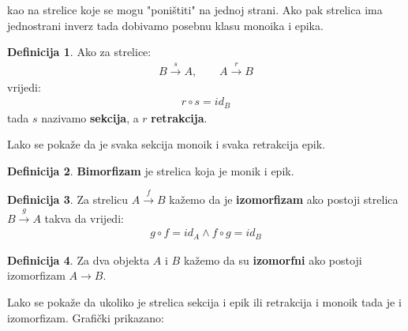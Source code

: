 \documentclass[11pt]{article}
\theoremstyle{definition}
\newtheorem{definition}{Definicija}
\begin{document}
    kao na strelice koje se mogu "poništiti" na jednoj strani. Ako pak strelica
    ima jednostrani inverz tada dobivamo posebnu klasu monoika i epika.
    \begin{definition}
      Ako za strelice:
      \begin{align*}
        B \xrightarrow{s} A, \qquad A \xrightarrow{r} B
      \end{align*}
      vrijedi:
      \begin{align*}
        r \circ s = id_B
      \end{align*}
      tada $s$ nazivamo \textbf{sekcija}, a $r$ \textbf{retrakcija}.
    \end{definition}
    Lako se pokaže da je svaka sekcija monoik i svaka retrakcija epik.
    \begin{definition}
      \textbf{Bimorfizam} je strelica koja je monik i epik.
    \end{definition}
    \begin{definition}
      Za strelicu $A \xrightarrow{f} B$ kažemo da je \textbf{izomorfizam} ako
      postoji strelica $B \xrightarrow{g} A$ takva da vrijedi:
      \begin{align}
        g \circ f = id_A \wedge f \circ g = id_B
      \end{align}
    \end{definition}
    \begin{definition}
      Za dva objekta $A$ i $B$ kažemo da su \textbf{izomorfni} ako postoji izomorfizam
      $A \xrightarrow{} B$.
    \end{definition}

    Lako se pokaže da ukoliko je strelica sekcija i epik ili retrakcija i
    monoik tada je i izomorfizam.
    Grafički prikazano:
    \begin{center}
    \end{center}
  \newpage
\end{document}
